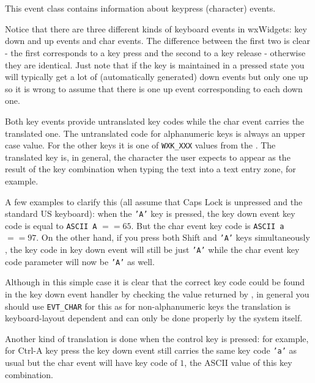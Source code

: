\section{}\label{wxkeyevent}

This event class contains information about keypress (character) events.

Notice that there are three different kinds of keyboard events in wxWidgets:
key down and up events and char events. The difference between the first two
is clear - the first corresponds to a key press and the second to a key
release - otherwise they are identical. Just note that if the key is
maintained in a pressed state you will typically get a lot of (automatically
generated) down events but only one up so it is wrong to assume that there is
one up event corresponding to each down one.

Both key events provide untranslated key codes while the char event carries
the translated one. The untranslated code for alphanumeric keys is always
an upper case value. For the other keys it is one of {\tt WXK\_XXX} values
from the . The translated key is, in
general, the character the user expects to appear as the result of the key
combination when typing the text into a text entry zone, for example.

A few examples to clarify this (all assume that {\sc Caps Lock} is unpressed
and the standard US keyboard): when the {\tt 'A'} key is pressed, the key down
event key code is equal to {\tt ASCII A} $== 65$. But the char event key code
is {\tt ASCII a} $== 97$. On the other hand, if you press both {\sc Shift} and
{\tt 'A'} keys simultaneously , the key code in key down event will still be
just {\tt 'A'} while the char event key code parameter will now be {\tt 'A'}
as well.

Although in this simple case it is clear that the correct key code could be
found in the key down event handler by checking the value returned by
, in general you should use
{\tt EVT\_CHAR} for this as for non-alphanumeric keys the translation is
keyboard-layout dependent and can only be done properly by the system itself.

Another kind of translation is done when the control key is pressed: for
example, for {\sc Ctrl-A} key press the key down event still carries the
same key code {\tt 'a'} as usual but the char event will have key code of
$1$, the ASCII value of this key combination.

